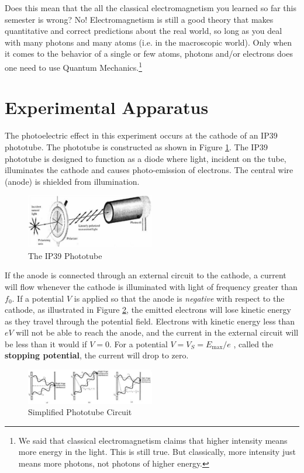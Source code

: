 Does this mean that the all the classical electromagnetism you learned so far this semester is wrong? No! Electromagnetism is still a good theory that makes quantitative and correct predictions about the real world, so long as you deal with many photons and many atoms (i.e. in the macroscopic world). Only when it comes to the behavior of a single or few atoms, photons and/or electrons does one need to use Quantum Mechanics.\footnote{We said that classical electromagnetism claims that higher intensity means more energy in the light. This is still true. But classically, more intensity just means more photons, not photons of higher energy.}

\section{Experimental Apparatus}
The photoelectric effect in this experiment occurs at the cathode of an IP39 phototube. The phototube is constructed as shown in Figure {\ref{fig:phototube}}. The IP39 phototube is designed to function as a diode where light, incident on the tube, illuminates the cathode and causes photo-emission of electrons. The central wire (anode) is shielded from illumination.
\begin{figure}[h]
\centering
\includegraphics[width=0.5\textwidth]{./Exp8/pic/image2.png}
\caption{The IP39 Phototube}
\label{fig:phototube}
\end{figure} 

If the anode is connected through an external circuit to the cathode, a current will flow whenever the cathode is illuminated with light of frequency greater than $f_0$. If a potential $V$ is applied so that the anode is \emph{negative} with respect to the cathode, as illustrated in Figure {\ref{fig:scircuit}}, the emitted electrons will lose kinetic energy as they travel through the potential field. Electrons with kinetic energy less than $eV$ will not be able to reach the anode, and the current in the external circuit will be less than it would if $V = 0$. For a potential $V = V_S = E_{\mathrm{max}} / e$ , called the \textbf{stopping potential}, the current will drop to zero.
\begin{figure}[h]
\centering
\includegraphics[width=0.5\textwidth]{./Exp8/pic/image3.png}
\caption{Simplified Phototube Circuit}
\label{fig:scircuit}
\end{figure} 

